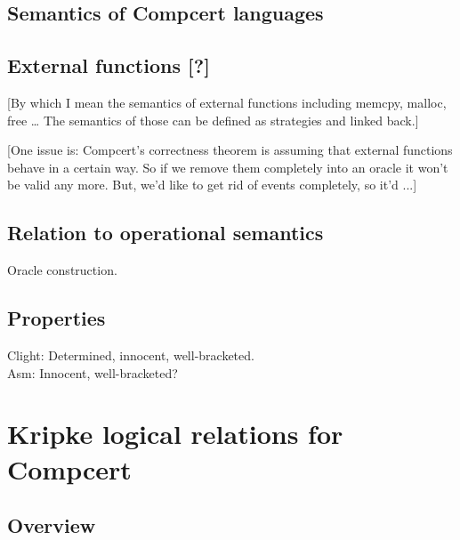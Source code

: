 \documentclass[acmsmall,anonymous]{acmart}
\begin{document}

\subsection{Semantics of Compcert languages} %


\subsection{External functions [?]} %

[By which I mean the semantics of external functions
including memcpy, malloc, free \ldots
The semantics of those can be defined as strategies
and linked back.]

[One issue is:
Compcert's correctness theorem is
assuming that external functions behave in a certain way.
So if we remove them completely into an oracle
it won't be valid any more.
But,
we'd like to get rid of events completely,
so it'd ...]


\subsection{Relation to operational semantics} %

Oracle construction.


\subsection{Properties} %

Clight: Determined, innocent, well-bracketed. \\
Asm: Innocent, well-bracketed?



\newpage
\section{Kripke logical relations for Compcert} %


\subsection{Overview} %
\end{document}
